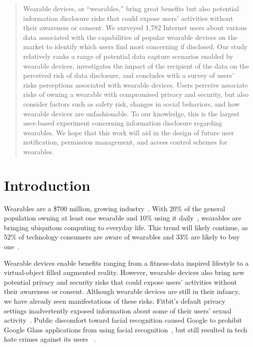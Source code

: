 \documentclass[conference]{IEEEtran}
\begin{document}
\begin{abstract}
\noindent Wearable devices, or ``wearables,'' bring great benefits but also potential information disclosure risks that could expose users' activities without their awareness or consent. We surveyed 1,782 Internet users about various data associated with the capabilities of popular wearable devices on the market to identify which users find most concerning if disclosed. Our study relatively ranks a range of potential data capture scenarios enabled by wearable devices, investigates the impact of the recipient of the data on the perceived risk of data disclosure, and concludes with a survey of users' risks perceptions associated with wearable devices. Users perceive associate risks of owning a wearable with compromised privacy and security, but also consider factors such as safety risk, changes in social behaviors, and how wearable devices are unfashionable. To our knowledge, this is the largest user-based experiment concerning information disclosure regarding wearables. We hope that this work will aid in the design of future user notification, permission management, and access control schemes for wearables.
\end{abstract}

\section{Introduction}

Wearables are a \$700 million, growing industry~\cite{cmo}. With 20\% of the general population owning at least one wearable and 10\% using it daily~\cite{WearableStatNews}, wearables are bringing ubiquitous computing to everyday life. This trend will likely continue, as 52\% of technology consumers are aware of wearables and 33\% are likely to buy one~\cite{NPD}.  

Wearable devices enable benefits ranging from a fitness-data inspired lifestyle to a virtual-object filled augmented reality. However, wearable devices also bring new potential privacy and security risks that could expose users' activities without their awareness or consent. Although wearable devices are still in their infancy, we have already seen manifestations of these risks. Fitbit's default privacy settings inadvertently exposed information about some of their users' sexual activity~\cite{Fitbit}. Public discomfort toward facial recognition caused Google to prohibit Google Glass applications from using facial recognition~\cite{GlassDetection}, but still resulted in tech hate crimes against its users ~\cite{1_russell_2014, 16_gross_2014}. 
\end{document}
